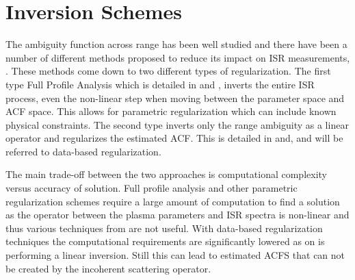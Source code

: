 %
%
%
%
%
\section{Inversion Schemes}
\label{sec:isrlit}
The ambiguity function across range has been well studied and there have been a number of different methods proposed to reduce its impact on ISR measurements,
\cite{RDS:RDS3308,hysell2008,nikoukar2008,Virtanen:20082vx}. These methods come down to two different types of regularization. The first type Full Profile Analysis which is detailed in \cite{RDS:RDS3308} and \cite{hysell2008}, inverts the entire ISR process, even the non-linear step when moving between the parameter space and ACF space. This allows for parametric regularization which can include known physical constraints. The second type inverts only the range ambiguity as a linear operator and regularizes the estimated ACF. This is detailed in \cite{nikoukar2008} and\cite{Virtanen:20082vx}, and will be referred to data-based regularization.

The main trade-off between the two approaches is computational complexity versus accuracy of solution. Full profile analysis and other parametric regularization schemes require a large amount of computation to find a solution as the operator between the plasma parameters and ISR spectra is non-linear and thus various techniques from are not useful. With data-based regularization techniques the computational requirements are significantly lowered as on is performing a linear inversion. Still this can lead to estimated ACFS that can not be created by the incoherent scattering operator.


